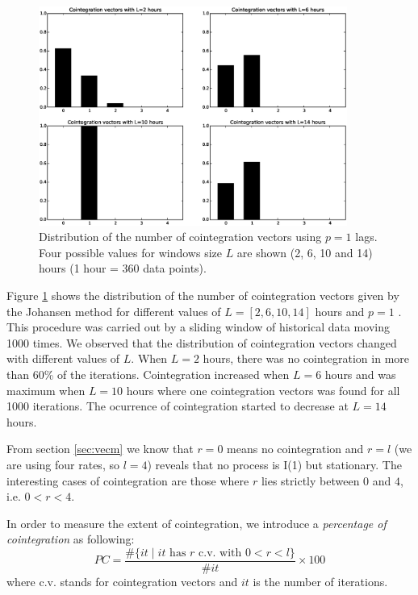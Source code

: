 \begin{figure}[!h]
  \centering
   \includegraphics[width=0.9\textwidth]{img/51_Fig1}
  \caption{Distribution of the number of cointegration vectors using $p=1$ lags.
  Four possible values for windows size $L$ are shown (2, 6, 10 and 14) hours (1
  hour = 360 data points).}
  \label{fig:hists}
\end{figure}

Figure \ref{fig:hists} shows the distribution of the number of cointegration
vectors given by the Johansen method for different values of $L=[2,6,10,14]$
hours and $p=1$ . This procedure was carried out by a sliding window of
historical data moving 1000 times. We observed that the distribution of
cointegration vectors changed with different values of $L$. When
$L=2$ hours, there was no cointegration in more than 60\% of the iterations.
Cointegration increased when $L=6$ hours and was maximum when $L=10$ hours where
one cointegration vectors was found for all 1000 iterations. The ocurrence of
cointegration started to decrease at $L=14$ hours.

From section \ref{sec:vecm} we know that $r=0$ means no cointegration and
$r=l$ (we are using four rates, so $l=4$) reveals that no process is I(1) but
stationary.  The interesting cases of cointegration are those where $r$ lies
strictly between $0$ and $4$, i.e. $0<r<4$.

In order to measure the extent of cointegration, we introduce a
{\em percentage of cointegration\/} as following:
\begin{equation} \label{eq:pcoint}
PC = 
\frac{\#\{ it \mid \text{$it$ has $r$ c.v. with $0<r<l$}\}}
     {\#it}\times 100
\end{equation}
where c.v. stands for cointegration vectors and $it$ is the number of iterations.

